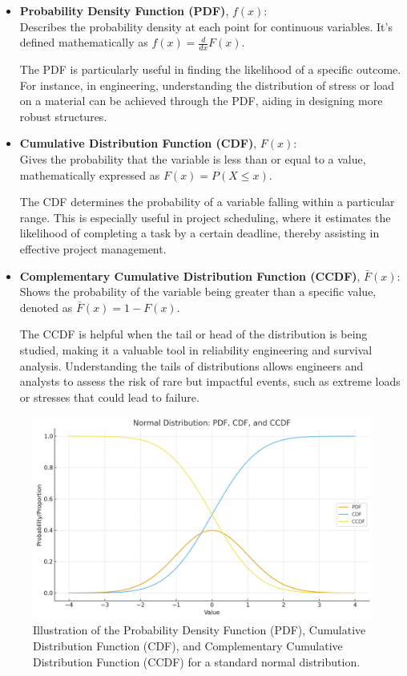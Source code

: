 \begin{itemize}
    \item \textbf{Probability Density Function (PDF)}, $f(x)$:\\ Describes the probability density at each point for continuous variables. It's defined mathematically as $f(x) = \frac{d}{dx}F(x)$.

        The PDF is particularly useful in finding the likelihood of a specific outcome. For instance, in engineering, understanding the distribution of stress or load on a material can be achieved through the PDF, aiding in designing more robust structures.

    
    \item \textbf{Cumulative Distribution Function (CDF)}, $F(x)$:\\Gives the probability that the variable is less than or equal to a value, mathematically expressed as $F(x) = P(X \leq x)$.

    The CDF determines the probability of a variable falling within a particular range. This is especially useful in project scheduling, where it estimates the likelihood of completing a task by a certain deadline, thereby assisting in effective project management.

    
    \item \textbf{Complementary Cumulative Distribution Function (CCDF)}, $\bar{F}(x)$:\\ Shows the probability of the variable being greater than a specific value, denoted as $\bar{F}(x) = 1 - F(x)$.

    The CCDF is helpful when the tail or head of the distribution is being studied, making it a valuable tool in reliability engineering and survival analysis. Understanding the tails of distributions allows engineers and analysts to assess the risk of rare but impactful events, such as extreme loads or stresses that could lead to failure.

\end{itemize}

\begin{figure}[ht]
\centering
\includegraphics[width=0.8\linewidth]{figures/cdf.png}
\caption{Illustration of the Probability Density Function (PDF), Cumulative Distribution Function (CDF), and Complementary Cumulative Distribution Function (CCDF) for a standard normal distribution. }
\label{fig:distributions}
\end{figure}

